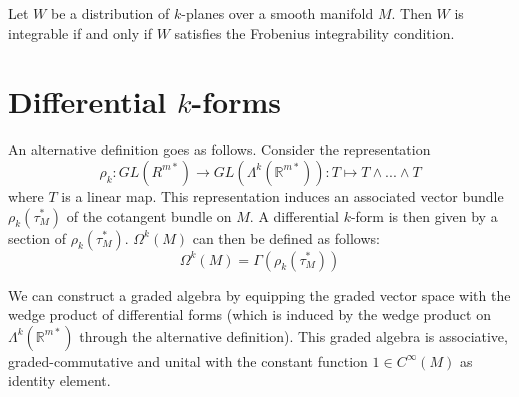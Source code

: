 	\begin{theorem}\label{manifolds:frobenius}
		Let $W$ be a distribution of $k$-planes over a smooth manifold $M$. Then $W$ is integrable if and only if $W$ satisfies the Frobenius integrability condition.
	\end{theorem}

\section{Differential \texorpdfstring{$k$}\ -forms}

	
	\begin{adefinition}
		An alternative definition goes as follows. Consider the representation \[\rho_k:GL(R^{m*})\rightarrow GL(\Lambda^k(\mathbb{R}^{m*})): T\mapsto T\wedge...\wedge T\] where $T$ is a linear map. This representation induces an associated vector bundle\footnotemark\ $\rho_k(\tau_M^*)$ of the cotangent bundle on $M$. A differential $k$-form is then given by a section of $\rho_k(\tau_M^*)$. $\Omega^k(M)$ can then be defined as follows: \[\Omega^k(M) = \Gamma(\rho_k(\tau_M^*))\]
	\end{adefinition}
	
	\begin{construct}
		We can construct a graded algebra by equipping the graded vector space
		with the wedge product of differential forms (which is induced by the wedge product on $\Lambda^k(\mathbb{R}^{m*})$ through the alternative definition). This graded algebra is associative, graded-commutative and unital with the constant function $1\in C^{\infty}(M)$ as identity element.
	\end{construct}

